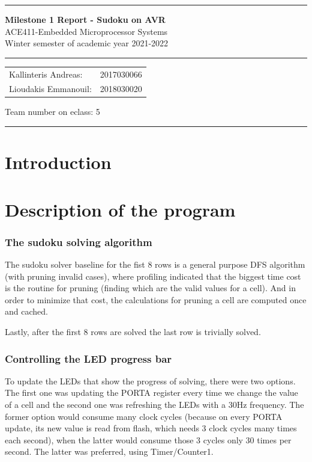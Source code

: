 \documentclass[12pt, a4, hidelinks]{article}
\begin{document}
\noindent \rule{\textwidth}{3pt}
\begin{center}
	{\bf \Large{Milestone 1 Report - Sudoku on AVR}}\\
	ACE411-Embedded Microprocessor Systems \\
	Winter semester of academic year 2021-2022
	\rule{\textwidth}{0.2mm} 
	\begin{tabular}{l r}
		Kallinteris Andreas:& 2017030066 \\ 
		Lioudakis Emmanouil:      &2018030020 
	\end{tabular} \vrule \hspace{3mm}
	\indent	Team number on eclass:  5
	\rule{\textwidth}{1pt}
\end{center}

\section*{Introduction}


\section*{Description of the program}

\subsubsection*{The sudoku solving algorithm}
The sudoku solver baseline for the fist 8 rows is a general purpose DFS algorithm (with pruning invalid cases), where profiling indicated that the biggest time cost is the routine for pruning (finding which are the valid values for a cell).
And in order to minimize that cost, the calculations for pruning a cell are computed once and cached.

\noindent Lastly, after the first 8 rows are solved the last row is trivially solved.


\subsubsection*{Controlling the LED progress bar}
To update the LEDs that show the progress of solving, there were two options. The first one was updating the PORTA register every time we change the value of a cell and the second one was refreshing the LEDs with a 30Hz frequency. The former option would consume many clock cycles (because on every PORTA update, its new value is read from flash, which needs 3 clock cycles many times each second), when the latter would consume those 3 cycles only 30 times per second. The latter was preferred, using Timer/Counter1.
\end{document}
